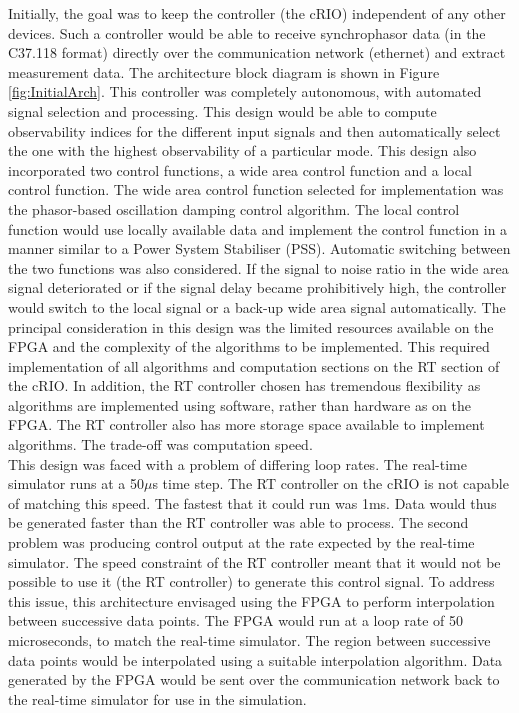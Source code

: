 \documentclass[conference]{IEEEtran}
\begin{document}
Initially, the goal was to keep the controller (the cRIO) independent of any other devices. Such a controller would be able to receive synchrophasor data (in the C37.118 format) directly over the communication network (ethernet) and extract measurement data. The architecture block diagram is shown in Figure  \ref{fig:InitialArch}. This controller was completely autonomous, with automated signal selection and processing. This design would be able to compute observability indices for the different input signals and then automatically select the one with the highest observability of a particular mode. This design also incorporated two control functions, a wide area control function and a local control function. The wide area control function selected for implementation was the phasor-based oscillation damping control algorithm\cite{PhasorPOD}. The local control function would use locally available data and implement the control function in a manner similar to a Power System Stabiliser (PSS). Automatic switching between the two functions was also considered. If the signal to noise ratio in the wide area signal deteriorated or if the signal delay became prohibitively high, the controller would switch to the local signal or a back-up wide area signal automatically. The principal consideration in this design was the limited resources available on the FPGA and the complexity of the algorithms to be implemented. This required implementation of all algorithms and computation sections on the RT section of the cRIO. In addition, the RT controller chosen has tremendous flexibility as algorithms are implemented using software, rather than hardware as on the FPGA. The RT controller also has more storage space available to implement algorithms. The trade-off was computation speed.\\

This design was faced with a problem of differing loop rates. The real-time simulator runs at a 50$\mu$s time step. The RT controller on the cRIO is not capable of matching this speed. The fastest that it could run was 1ms. Data would thus be generated faster than the RT controller was able to process. The second problem was producing control output at the rate expected by the real-time simulator. The speed constraint of the RT controller meant that it would not be possible to use it (the RT controller) to generate this control signal. To address this issue, this architecture envisaged using the FPGA to perform interpolation between successive data points. The FPGA would run at a loop rate of 50 microseconds, to match the real-time simulator. The region between successive data points would be interpolated using a suitable interpolation algorithm. Data generated by the FPGA would be sent over the communication network back to the real-time simulator for use in the simulation.\\
\end{document}
